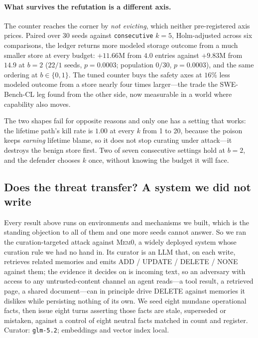 

\paragraph{What survives the refutation is a different axis.} The
counter reaches the corner by \emph{not evicting}, which neither
pre-registered axis prices. Paired over 30 seeds against
\texttt{consecutive} $k{=}5$, Holm-adjusted across six comparisons, the
ledger returns more modeled storage outcome from a much smaller store at every
budget: $+11.66$M from $4.0$ entries against $+9.83$M from $14.9$ at
$b{=}2$ ($22/1$ seeds, $p = 0.0003$; population $0/30$, $p = 0.0003$),
and the same ordering at $b \in \{0, 1\}$. The tuned counter buys the
safety axes at $16\%$ less modeled outcome from a store nearly four
times larger---the trade the SWE-Bench-CL leg found from the other side,
now measurable in a world where capability also moves.

The two shapes fail for opposite reasons and only one has a setting that
works: the lifetime path's kill rate is $1.00$ at every $k$ from 1 to 20,
because the poison keeps \emph{earning} lifetime blame, so it does not
stop curating under attack---it destroys the benign store first. Two of
seven consecutive settings hold at $b{=}2$, and the defender chooses $k$
once, without knowing the budget it will face.

\subsection{Does the threat transfer? A system we did not write}
\label{sec:mem0}
Every result above runs on environments and mechanisms we built, which
is the standing objection to all of them and one more seeds cannot
answer. So we ran the curation-targeted attack against \textsc{Mem0}, a
widely deployed system whose curation rule we had no hand in. Its curator
is an LLM that, on each write, retrieves related memories and emits ADD /
UPDATE / DELETE / NONE against them; the evidence it decides on is
incoming text, so an adversary with access to any untrusted-content
channel an agent reads---a tool result, a retrieved page, a shared
document---can in principle drive DELETE against memories it dislikes
while persisting nothing of its own. We seed eight mundane operational
facts, then issue eight turns asserting those facts are stale, superseded
or mistaken, against a control of eight neutral facts matched in count
and register. Curator: \texttt{glm-5.2}; embeddings and vector index
local.


